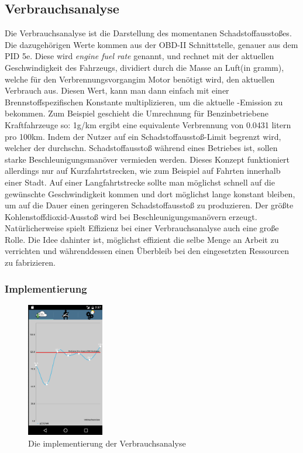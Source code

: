 \subsection{Verbrauchsanalyse}
\label{subsec:verbrauchsanalyse}

Die Verbrauchsanalyse ist die Darstellung des momentanen Schadstoffausstoßes.
Die dazugehörigen Werte kommen aus der OBD-II Schnittstelle, genauer aus dem PID 5e.
Diese wird \textit{engine fuel rate} genannt, und rechnet mit der 
aktuellen Geschwindigkeit des Fahrzeugs, dividiert durch die Masse an Luft(in gramm), 
welche für den Verbrennungsvorgangim Motor benötigt wird,
den aktuellen Verbrauch aus. Diesen Wert, kann man dann einfach mit einer Brennstoffspezifischen
Konstante multiplizieren, um die aktuelle -Emission zu bekommen.
Zum Beispiel geschieht die Umrechnung für Benzinbetriebene Kraftfahrzeuge so:
1g/km  ergibt eine equivalente Verbrennung von 0.0431 litern pro 100km. 
Indem der Nutzer auf ein Schadstoffausstoß-Limit begrenzt wird, welcher der durchschn.
Schadstoffausstoß während eines Betriebes ist, sollen starke Beschleunigungsmanöver 
vermieden werden. Dieses Konzept funktioniert allerdings nur auf Kurzfahrtstrecken,
wie zum Beispiel auf Fahrten innerhalb einer Stadt.
Auf einer Langfahrtstrecke sollte man möglichst schnell auf die gewünschte Geschwindigkeit kommen
und dort möglichst lange konstant bleiben, um auf die Dauer einen geringeren Schadstoffausstoß zu produzieren.
Der größte Kohlenstoffdioxid-Ausstoß wird bei Beschleunigungsmanövern erzeugt.
Natürlicherweise spielt Effizienz bei einer Verbrauchsanalyse auch eine große Rolle.
Die Idee dahinter ist, möglichst effizient die selbe Menge an Arbeit zu verrichten und währenddessen einen Überbleib
bei den eingesetzten Ressourcen zu fabrizieren. 




\subsubsection{Implementierung}

\begin{figure}
    \centering
    \includegraphics[width=0.3\textwidth]{images/verbrauch}
    \caption{Die implementierung der Verbrauchsanalyse \cite{BOZH.ch3-verbrauchsanalyse.verbrauch}}
\end{figure}

